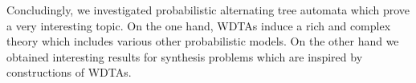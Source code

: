 Concludingly, we investigated probabilistic alternating tree automata which
prove a very interesting topic. On the one hand, \acp{WDTA} induce a rich and
complex theory which includes various other probabilistic models. On the other
hand we obtained interesting results for synthesis problems which are inspired
by constructions of \acp{WDTA}.
